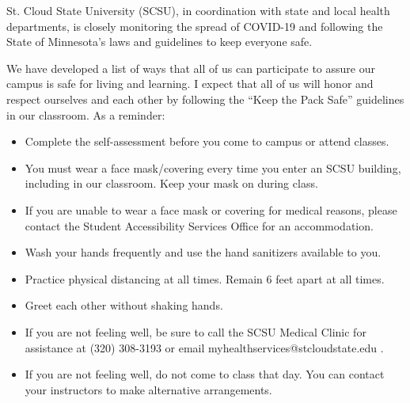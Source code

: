 \documentclass{tufte-handout}
\begin{document}
\begin{fullwidth}

St. Cloud State University (SCSU), in coordination with state and local health departments, is closely monitoring the spread of COVID-19 and following the State of Minnesota’s laws and guidelines to keep everyone safe.

We have developed a list of ways that all of us can participate to assure our campus is safe for living and learning. I expect that all of us will honor and respect ourselves and each other by following the ``Keep the Pack Safe'' guidelines in our classroom. As a reminder:

\begin{itemize}
\item Complete the self-assessment before you come to campus or attend classes.
\item You must wear a face mask/covering every time you enter an SCSU building, including in our classroom. Keep your mask on during class.
\item If you are unable to wear a face mask or covering for medical reasons, please contact the Student Accessibility Services Office for an accommodation.
\item Wash your hands frequently and use the hand sanitizers available to you.
\item Practice physical distancing at all times. Remain 6 feet apart at all times.
\item Greet each other without shaking hands.
\item If you are not feeling well, be sure to call the SCSU Medical Clinic for assistance at (320) 308-3193 or email myhealthservices@stcloudstate.edu .
\item If you are not feeling well, do not come to class that day. You can contact your instructors to make alternative arrangements.
\end{itemize}

\end{fullwidth}

\end{document}
